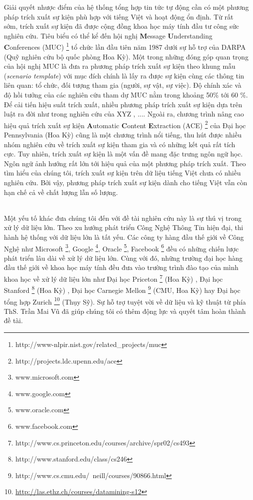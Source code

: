 \noindent Giải quyết nhược điểm của hệ thống tổng hợp tin tức tự động cần có một phương pháp trích xuất sự kiện phù hợp với tiếng Việt và hoạt động ổn định. Từ rất sớm, trích xuất sự kiện đã được cộng đồng khoa học máy tính đầu tư công sức nghiên cứu. Tiêu biểu có thể kể đến hội nghị \textbf{M}essage \textbf{U}nderstanding \textbf{C}onferences (MUC) \footnote{http://www-nlpir.nist.gov/related\_projects/muc}   tổ chức lần đầu tiên  năm 1987 dưới sự hỗ trợ của DARPA (Quỹ nghiên cứu bộ quốc phòng Hoa Kỳ). Một trong những đóng góp quan trọng của hội nghị MUC là đưa ra phương pháp trích xuất sự kiện theo khung  mẫu (\emph{scenario template}) với mục đích chính là lấy ra được sự kiện cùng các thông tin liên quan: tổ chức, đối tượng tham gia (người, sự vật, sự  việc). Độ chính xác và độ hồi tưởng của các nghiên cứu tham dự MUC nằm trong khoảng 50$\%$ tới 60 $\%$. Để cải tiến hiệu suất trích xuất, nhiều phương pháp trích xuất sự kiện dựa trên luật ra đời như trong nghiên cứu của XYZ , .... Ngoài ra, chương trình nâng cao hiệu quả trích xuất sự kiện \textbf{A}utomatic \textbf{C}ontent \textbf{E}xtraction (ACE) \footnote{http://projects.ldc.upenn.edu/ace} của Đại học Pennsylvania (Hoa Kỳ) cũng là một chương trình nổi tiếng, thu hút được nhiều nhóm nghiên cứu về trích xuất sự kiện tham gia và có những kết quả rất tích cực. Tuy nhiên, trích xuất sự kiện là một vấn đề mang đặc trưng ngôn ngữ học. Ngôn ngữ ảnh hướng rất lớn tới hiệu quả của một phương pháp trích xuất. Theo tìm hiểu của chúng tôi, trích xuất sự kiện trên dữ liệu tiếng Việt chưa có nhiều nghiên cứu. Bởi vậy, phương pháp trích xuất sự kiện dành cho tiếng Việt vẫn còn hạn chế cả về chất lượng lẫn số lượng.

\\
\noindent Một yếu tố khác đưa chúng tôi đến với đề tài nghiên cứu này là sự thú vị trong xử lý dữ liệu lớn. Theo xu hướng phát triển Công Nghệ Thông Tin hiện đại, thi hành hệ thống với dữ liệu lớn là tất yếu. Các công ty hàng đầu thế giới về Công Nghệ như Microsoft \footnote{www.microsoft.com}, Google \footnote{www.google.com}, Oracle \footnote{www.oracle.com}, Facebook \footnote{www.facebook.com} đều có những chiến lược phát triển lâu dài về xử lý dữ liệu lớn. Cùng với đó, những trường đại học hàng đầu thế giới về khoa học máy tính đều đưa vào trường trình đào tạo của mình khoa học về xử lý dữ liệu lớn như Đại học Priceton \footnote{http://www.cs.princeton.edu/courses/archive/spr02/cs493} (Hoa Kỳ) , Đại học Stanford \footnote{http://www.stanford.edu/class/cs246} (Hoa Kỳ) , Đại học Carnegie Mellon \footnote{http://www.cs.cmu.edu/~neill/courses/90866.html} (CMU, Hoa Kỳ) hay Đại học tổng hợp Zurich \footnote{\href{http://las.ethz.ch/courses/datamining-s12}{http://las.ethz.ch/courses/datamining-s12}} (Thụy Sỹ). Sự hỗ trợ tuyệt vời về dữ liệu và kỹ thuật  từ phía ThS. Trần Mai Vũ đã giúp chúng tôi có thêm động lực và quyết tâm hoàn thành đề tài.



